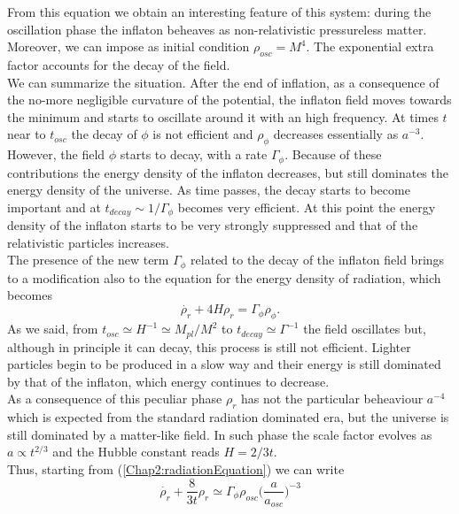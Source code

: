 \documentclass[11pt,a4paper,twoside]{book}
\begin{document}
From this equation we obtain an interesting feature of this system: during the oscillation phase the inflaton beheaves as non-relativistic pressureless matter. Moreover, we can impose as initial condition $ \rho_{osc}=M^{4} $.
The exponential extra factor accounts for the decay of the field.\\
We can summarize the situation. After the end of inflation, as a consequence of the no-more negligible curvature of the potential, the inflaton field moves towards the minimum and starts to oscillate around it with an high frequency. At times $ t $ near to $ t_{osc} $ the decay of $\phi$ is not efficient and $\rho_{\phi}$ decreases essentially as $ a^{-3} $. However, the field $\phi$ starts to decay, with a rate $\Gamma_{\phi}$. Because of these contributions the energy density of the inflaton decreases, but still dominates the energy density of the universe. As time passes, the decay starts to become important and  at $ t_{decay} \sim 1/\Gamma_{\phi} $ becomes very efficient.
At this point the energy density of the inflaton starts to be very strongly suppressed and that of the relativistic particles increases.\\
The presence of the new term $\Gamma_{\phi}$ related  to the decay of the inflaton field brings to a modification also to the equation for the energy density of radiation, which becomes
\begin{equation}
	\label{Chap2:radiationEquation}
	\dot{\rho_{r}} + 4H\rho_{r} = \Gamma_{\phi}\rho_{\phi}.
\end{equation}
As we said, from $ t_{osc} \simeq H^{-1} \simeq M_{pl}/M^{2} $ to $ t_{decay} \simeq \Gamma^{-1} $ the field oscillates but, although in principle it can decay, this process is still not efficient. Lighter particles begin to be produced in a slow way and their energy is still dominated by that of the inflaton, which energy continues to decrease.\\
As a consequence of this peculiar phase $\rho_{r}$ has not the particular beheaviour $ a^{-4} $ which is expected from the standard radiation dominated era, but the universe is still dominated by a matter-like field. In such phase the scale factor evolves as $ a \propto t^{2/3} $ and the Hubble constant reads $ H=2/3t $.\\
Thus, starting from (\ref{Chap2:radiationEquation}) we can write
\begin{equation}
	\label{Chap2:radiationEquation2}
	\dot{\rho_{r}} + \frac{8}{3t}\rho_{r}\simeq \Gamma_{\phi}\rho_{osc}\Big (\frac{a}{a_{osc}}\Big)^{-3}
\end{equation}
\end{document}
